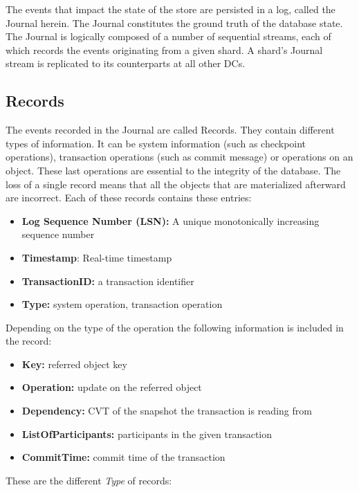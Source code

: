 \documentclass[twoside]{article}
\begin{document}
The events that impact the state of the store are persisted in a log, called the
Journal herein. 
The Journal constitutes the ground truth of the database state. 
The Journal is logically composed of a number of sequential streams, each of
which records the events originating from a given shard. 
A shard’s Journal stream is replicated to its counterparts at all other DCs. 

\subsection{Records}
\label{sec:record}

The events recorded in the Journal are called Records.
They contain different types of information. 
It can be system information (such as checkpoint operations), transaction
operations (such as commit message) or operations on an object.
These last operations are essential to the integrity of the database.
The loss of a single record means that all the objects that are materialized
afterward are incorrect.
Each of these records contains these entries:
\begin{itemize}
  \item \textbf{Log Sequence Number (LSN):} A unique monotonically increasing 
  sequence number
  \item \textbf{Timestamp}: Real-time timestamp 
  \item \textbf{TransactionID:} a transaction identifier 
  \item \textbf{Type:} system operation, transaction operation
\end{itemize}
Depending on the type of the operation the following information is included
in the record:
\begin{itemize}
  \item \textbf{Key:} referred object key
  \item \textbf{Operation:} update on the referred object
  \item \textbf{Dependency:} CVT of the snapshot the transaction is reading from
  \item \textbf{ListOfParticipants:} participants in the given transaction
  \item \textbf{CommitTime:} commit time of the transaction
\end{itemize}

These are the different \textit{Type} of records:
\end{document}
